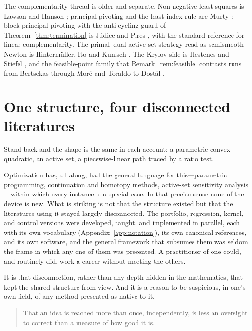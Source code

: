 The complementarity thread is older and separate. Non-negative least squares is Lawson
and Hanson \cite{lawson1974}; principal pivoting and the least-index rule are Murty
\cite{murty1988}; block principal pivoting with the anti-cycling guard of
Theorem~\ref{thm:termination} is Júdice and Pires \cite{judice1994}, with
\cite{cottle1992} the standard reference for linear complementarity. The primal--dual
active set strategy read as semismooth Newton is Hintermüller, Ito and Kunisch
\cite{hintermuller2002}. The Krylov side is Hestenes and Stiefel \cite{hestenes1952},
and the feasible-point family that Remark~\ref{rem:feasible} contrasts runs from
Bertsekas \cite{bertsekas1982} through Moré and Toraldo \cite{moretoraldo1991} to
Dostál \cite{dostal1997,dostalschoberl2005}.

\section{One structure, four disconnected literatures}

Stand back and the shape is the same in each account: a parametric convex quadratic, an
active set, a piecewise-linear path traced by a ratio test.

Optimization has, all along, had the general language for this---parametric programming,
continuation and homotopy methods, active-set sensitivity analysis---within which every
instance is a special case. In that precise sense none of the device is new. What is
striking is not that the structure existed but that the literatures using it stayed
largely disconnected. The portfolio, regression, kernel, and control versions were
developed, taught, and implemented in parallel, each with its own vocabulary
(Appendix~\ref{app:notation}), its own canonical references, and its own software, and
the general framework that subsumes them was seldom the frame in which any one of them
was presented. A practitioner of one could, and routinely did, work a career without
meeting the others.

It is that disconnection, rather than any depth hidden in the mathematics, that kept the
shared structure from view. And it is a reason to be suspicious, in one's own field, of
any method presented as native to it.

\begin{quote}
That an idea is reached more than once, independently, is less an oversight to correct
than a measure of how good it is.
\end{quote}
